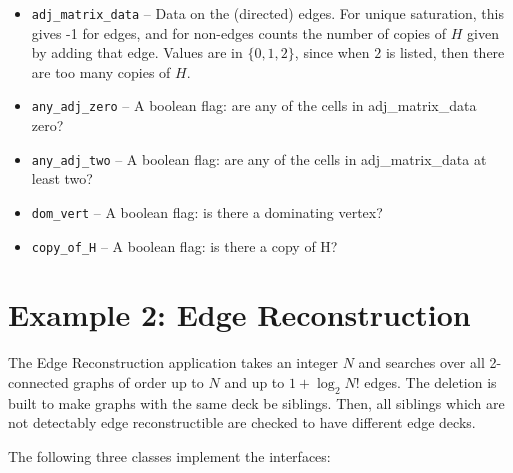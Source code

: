 \documentclass[11pt]{article}
\begin{document}
\begin{itemize}
	\item \texttt{adj\_matrix\_data} -- Data on the (directed) edges.
		For unique saturation, this gives -1 for edges, and 
			for non-edges counts the number of copies of $H$
			given by adding that edge.
		Values are in $\{0,1,2\}$, since when $2$ is 
			listed, then there are too many copies of $H$.

	\item \texttt{any\_adj\_zero} -- A boolean flag: are any of the cells in adj\_matrix\_data zero?
		
	\item \texttt{any\_adj\_two} -- A boolean flag:  are any of the cells in adj\_matrix\_data at least two?
	
	\item \texttt{dom\_vert} -- A boolean flag: is there a dominating vertex?

	\item \texttt{copy\_of\_H} -- A boolean flag: is there a copy of H?

\end{itemize}


\section{Example 2: Edge Reconstruction}

The Edge Reconstruction application takes an integer $N$
	and searches over all 2-connected graphs of order up to $N$
	and up to $1+ \log_2 N!$ edges.
The deletion is built to make graphs with the same deck 
	be siblings.
Then, all siblings which are not detectably edge reconstructible
	are checked to have different edge decks.
	
The following three classes implement the interfaces:
\end{document}
